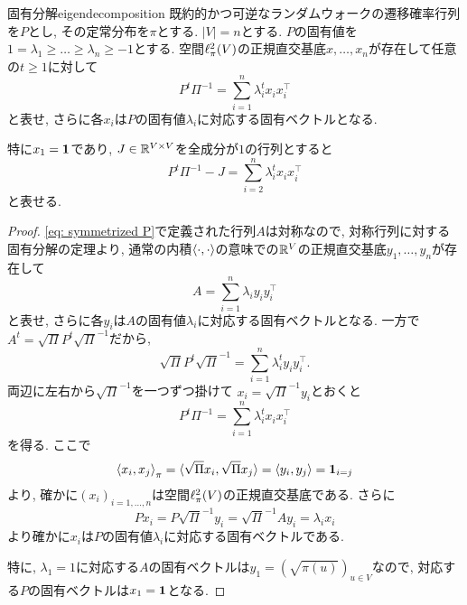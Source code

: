 %
\begin{theorem}{固有分解}{eigendecomposition}
    既約的かつ可逆なランダムウォークの遷移確率行列を$P$とし, その定常分布を$\pi$とする.
    $|V|=n$とする.
    $P$の固有値を$1=\lambda_1\ge \dots \ge \lambda_n \ge -1$とする.
    空間$\ell^2_\pi(V)$の正規直交基底$x,\dots,x_n$が存在して任意の$t\ge 1$に対して
    \[ P^t\Pi^{-1} = \sum_{i=1}^n \lambda_i^t x_i x_i^{\top}  \]
    と表せ, さらに各$x_i$は$P$の固有値$\lambda_i$に対応する固有ベクトルとなる.
    
    特に$x_1 = \mathbf{1}$であり,
    $J \in \mathbb{R}^{V \times V}$を全成分が$1$の行列とすると
    \[ P^t \Pi^{-1} - J =  \sum_{i=2}^n \lambda_i^t x_i x_i^\top \]
    と表せる.
\end{theorem}
\begin{proof}
    \cref{eq: symmetrized P}で定義された行列$A$は対称なので,
    対称行列に対する固有分解の定理より,
    通常の内積$\langle\cdot, \cdot\rangle$の意味での$\mathbb{R}^V$の正規直交基底$y_1,\dots,y_n$が存在して
    \[
        A = \sum_{i=1}^n \lambda_i y_i y_i^\top
    \]
    と表せ, さらに各$y_i$は$A$の固有値$\lambda_i$に対応する固有ベクトルとなる.
    一方で$A^t = \sqrt{\Pi} P^t \sqrt{\Pi}^{-1}$だから,
    \[
        \sqrt{\Pi} P^t \sqrt{\Pi}^{-1} = \sum_{i=1}^n \lambda_i^t y_i y_i^\top.
    \]
    両辺に左右から$\sqrt{\Pi}^{-1}$を一つずつ掛けて
    $x_i = \sqrt{\Pi}^{-1}y_i$とおくと
    \[
        P^t \Pi^{-1} = \sum_{i=1}^n \lambda_i^t x_i x_i^\top
    \]
    を得る.
    ここで
    \[
        \left\langle x_i,x_j\right\rangle_{\pi} = \langle\sqrt{\Pi}x_i,\sqrt{\Pi}x_j\rangle = \langle y_i,y_j\rangle = \mathbf{1}_{i=j}
    \]
    より, 確かに$(x_i)_{i=1,\dots,n}$は空間$\ell^2_\pi(V)$の正規直交基底である.
    さらに
    \[
        Px_i = P\sqrt{\Pi}^{-1}y_i = \sqrt{\Pi}^{-1}Ay_i = \lambda_i x_i
    \]
    より確かに$x_i$は$P$の固有値$\lambda_i$に対応する固有ベクトルである.

    特に, $\lambda_1=1$に対応する$A$の固有ベクトルは$y_1 = (\sqrt{\pi(u)})_{u \in V}$なので,
    対応する$P$の固有ベクトルは$x_1 = \mathbf{1}$となる.
\end{proof}

